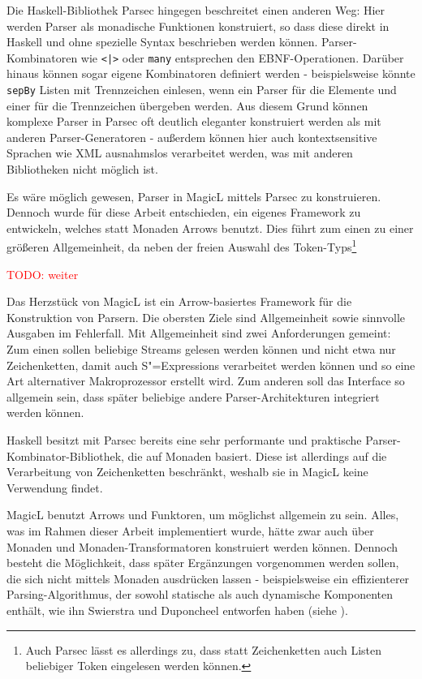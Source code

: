 \documentclass[11pt, a4paper, bibgerm]{book}
\newcommand\icode[1]{\lstinline?#1?}
\newcommand{\todo}[1]{
  \textcolor{red}{TODO: #1}
}
\newcommand{\sexps}{S"=Expressions}
\begin{document}
Die Haskell-Bibliothek Parsec\cite{Parsec} hingegen beschreitet einen
anderen Weg: Hier werden Parser als monadische Funktionen konstruiert,
so dass diese direkt in Haskell und ohne spezielle Syntax beschrieben
werden können. Parser-Kombinatoren wie \icode{<|>} oder \icode{many}
entsprechen den EBNF-Operationen. Darüber hinaus können sogar eigene
Kombinatoren definiert werden - beispielsweise könnte \icode{sepBy}
Listen mit Trennzeichen einlesen, wenn ein Parser für die Elemente und
einer für die Trennzeichen übergeben werden. Aus diesem Grund können
komplexe Parser in Parsec oft deutlich eleganter konstruiert werden als
mit anderen Parser-Generatoren - außerdem können hier auch
kontextsensitive Sprachen wie XML ausnahmslos verarbeitet werden, was
mit anderen Bibliotheken nicht möglich ist.

Es wäre möglich gewesen, Parser in MagicL mittels Parsec zu
konstruieren. Dennoch wurde für diese Arbeit entschieden, ein eigenes
Framework zu entwickeln, welches statt Monaden Arrows benutzt. Dies
führt zum einen zu einer größeren Allgemeinheit, da neben der freien
Auswahl des Token-Typs\footnote{Auch Parsec lässt es allerdings zu, dass
statt Zeichenketten auch Listen beliebiger Token eingelesen werden
können.} 

\todo{weiter}

Das Herzstück von MagicL ist ein Arrow-basiertes Framework für die
Konstruktion von Parsern. Die obersten Ziele sind Allgemeinheit sowie
sinnvolle Ausgaben im Fehlerfall. Mit Allgemeinheit sind zwei
Anforderungen gemeint: Zum einen sollen beliebige Streams gelesen
werden können und nicht etwa nur Zeichenketten, damit auch \sexps{}
verarbeitet werden können und so eine Art alternativer Makroprozessor
erstellt wird. Zum anderen soll das Interface so allgemein sein, dass
später beliebige andere Parser-Architekturen integriert werden können.

Haskell besitzt mit Parsec bereits eine sehr
performante und praktische Parser-Kombinator-Bibliothek, die auf Monaden
basiert. Diese ist allerdings auf die Verarbeitung von Zeichenketten
beschränkt, weshalb sie in MagicL keine Verwendung findet.

MagicL benutzt Arrows und Funktoren, um möglichst allgemein zu
sein. Alles, was im Rahmen dieser Arbeit implementiert wurde, hätte zwar
auch über Monaden und Monaden-Transformatoren konstruiert werden
können. Dennoch besteht die Möglichkeit, dass später Ergänzungen
vorgenommen werden sollen, die sich nicht mittels Monaden ausdrücken
lassen - beispielsweise ein effizienterer Parsing-Algorithmus, der
sowohl statische als auch dynamische Komponenten enthält, wie ihn
Swierstra und Duponcheel entworfen haben (siehe \cite[S. 8ff]{Hughes}).
\end{document}
